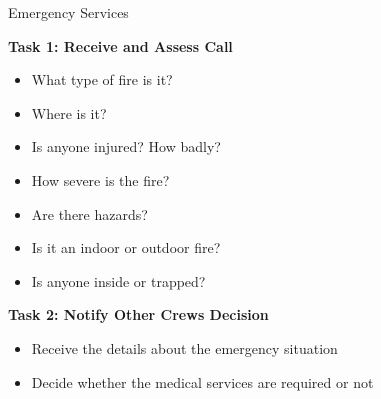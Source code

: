 \begin{frame}{Emergency Services}
    \begin{center}
        \textbf{Task 1: Receive and Assess Call}
    \end{center}
    \begin{multicols}{2}
        \begin{itemize}
            \item What type of fire is it?
            \item Where is it? 
            \item Is anyone injured? How badly? 
            \item How severe is the fire? 
            \item Are there hazards? 
            \item Is it an indoor or outdoor fire? 
            \item Is anyone inside or trapped? 
        \end{itemize}
    \end{multicols}
    \vspace{0.5cm}
    \begin{center}
        \textbf{Task 2: Notify Other Crews Decision}
    \end{center}
        \begin{itemize}
            \item Receive the details about the emergency situation
            \item Decide whether the medical services are required or not
        \end{itemize}
\end{frame}

